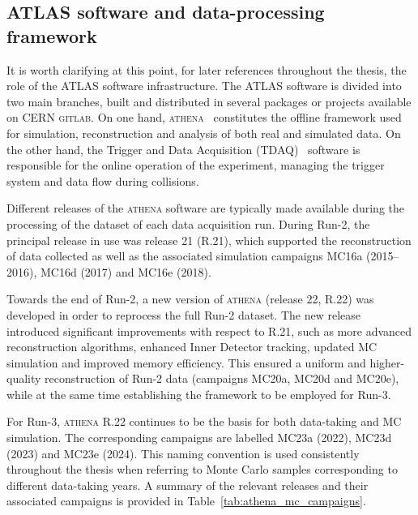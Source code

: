 \subsection{ATLAS software and data-processing framework}
\label{sec:athena}

It is worth clarifying at this point, for later references throughout the thesis, the role of the ATLAS software infrastructure. The ATLAS software is divided into two main branches, built and distributed in several packages or projects available on CERN \textsc{gitlab}. On one hand, \textsc{athena}~\cite{athena} constitutes the offline framework used for simulation, reconstruction and analysis of both real and simulated data. On the other hand, the Trigger and Data Acquisition (TDAQ)~\cite{tdaq} software is responsible for the online operation of the experiment, managing the trigger system and data flow during collisions. 

Different releases of the \textsc{athena} software are typically made available during the processing of the dataset of each data acquisition run. During Run-2, the principal release in use was release 21 (R.21), which supported the reconstruction of data collected as well as the associated simulation campaigns MC16a (2015--2016), MC16d (2017) and MC16e (2018). 

Towards the end of Run-2, a new version of \textsc{athena} (release 22, R.22) was developed in order to reprocess the full Run-2 dataset. The new release introduced significant improvements with respect to R.21, such as more advanced reconstruction algorithms, enhanced Inner Detector tracking, updated MC simulation and improved memory efficiency. This ensured a uniform and higher-quality reconstruction of Run-2 data (campaigns MC20a, MC20d and MC20e), while at the same time establishing the framework to be employed for Run-3.

For Run-3, \textsc{athena} R.22 continues to be the basis for both data-taking and MC simulation. The corresponding campaigns are labelled MC23a (2022), MC23d (2023) and MC23e (2024). This naming convention is used consistently throughout the thesis when referring to Monte Carlo samples corresponding to different data-taking years. A summary of the relevant releases and their associated campaigns is provided in Table~\ref{tab:athena_mc_campaigns}.

